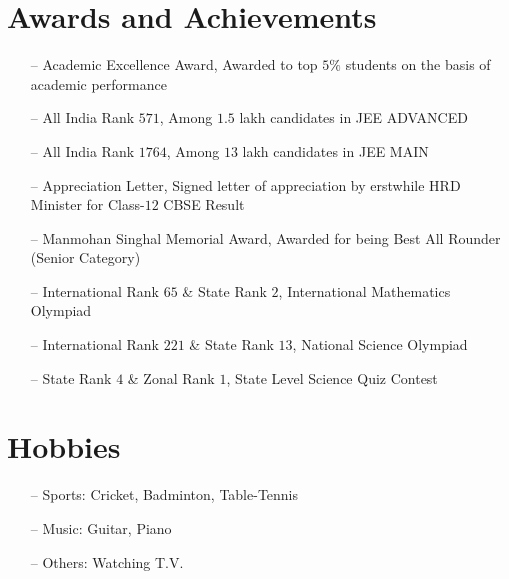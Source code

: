 \documentclass{article}
\begin{document}
\section*{\fontsize{10}{12}\selectfont Awards and Achievements}
\vspace*{-2mm}
\begin{itemize}
    \item[--] Academic Excellence Award, Awarded to top $5\%$ students on the basis of academic performance
    \item[--] All India Rank $571$, Among $1.5$ lakh candidates in JEE ADVANCED
    \item[--] All India Rank $1764$, Among $13$ lakh candidates in JEE MAIN
    \item[--] Appreciation Letter, Signed letter of appreciation by erstwhile HRD Minister for Class-$12$ CBSE Result
    \item[--] Manmohan Singhal Memorial Award, Awarded for being Best All Rounder (Senior Category)
    \item[--] International Rank $65$ \& State Rank $2$, International Mathematics Olympiad
    \item[--] International Rank $221$ \& State Rank $13$, National Science Olympiad
    \item[--] State Rank $4$ \& Zonal Rank $1$, State Level Science Quiz Contest
\end{itemize}
\vspace*{-2mm}
\section*{\fontsize{10}{12}\selectfont Hobbies}
\vspace*{-2mm}
\begin{itemize}
    \item[--] Sports: Cricket, Badminton, Table-Tennis
    \item[--] Music: Guitar, Piano
    \item[--] Others: Watching T.V.
\end{itemize}
\end{document}
